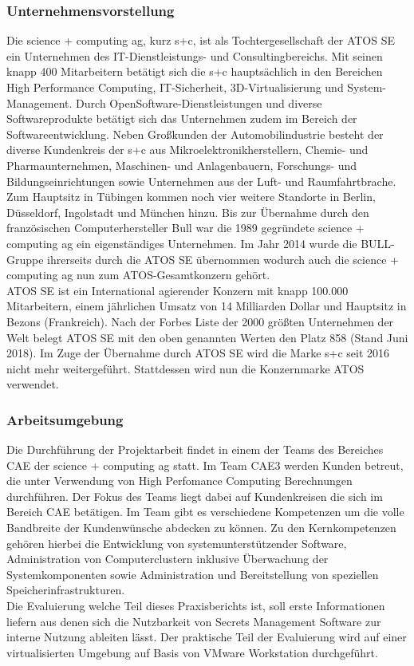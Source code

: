 \documentclass[
book,
a4paper,   
titlepage,  
halfparskip,
12pt        
]{scrartcl}
\begin{document}
\begin{onehalfspacing}
\subsubsection{Unternehmensvorstellung}
Die science + computing ag, kurz s+c, ist als Tochtergesellschaft der ATOS SE ein Unternehmen des \ac{IT}-Dienstleistungs- und Consultingbereichs. Mit seinen knapp 400 Mitarbeitern betätigt sich die s+c hauptsächlich in den Bereichen High Performance Computing, \ac{IT}-Sicherheit, 3D-Virtualisierung und System-Management. Durch OpenSoftware-Dienstleistungen und diverse Softwareprodukte betätigt sich das Unternehmen zudem im Bereich der Softwareentwicklung. Neben Großkunden der Automobilindustrie besteht der diverse Kundenkreis der s+c aus Mikroelektronikherstellern, Chemie- und Pharmaunternehmen, Maschinen- und Anlagenbauern, Forschungs- und Bildungseinrichtungen sowie Unternehmen aus der Luft- und Raumfahrtbrache.\\
Zum Hauptsitz in Tübingen kommen noch vier weitere Standorte in Berlin, Düsseldorf, Ingolstadt und München hinzu. Bis zur Übernahme durch den französischen Computerhersteller Bull war die 1989 gegründete science + computing ag ein eigenständiges Unternehmen.\cite{bull} Im Jahr 2014 wurde die BULL-Gruppe ihrerseits durch die ATOS SE übernommen wodurch auch die science + computing ag nun zum ATOS-Gesamtkonzern gehört.\cite{atos}\\
ATOS SE ist ein International agierender Konzern mit knapp 100.000 Mitarbeitern, einem jährlichen Umsatz von 14 Milliarden Dollar und Hauptsitz in Bezons (Frankreich). Nach der Forbes Liste der 2000 größten Unternehmen der Welt belegt ATOS SE mit den oben genannten Werten den Platz 858 (Stand Juni 2018).\cite{forbes} Im Zuge der Übernahme durch ATOS SE wird die Marke s+c seit 2016 nicht mehr weitergeführt. Stattdessen wird nun die Konzernmarke ATOS verwendet.

\subsubsection{Arbeitsumgebung}
Die Durchführung der Projektarbeit findet in einem der Teams des Bereiches \ac{CAE} der science + computing ag statt. Im Team \ac{CAE}3 werden Kunden betreut, die unter Verwendung von High Perfomance Computing Berechnungen durchführen. Der Fokus des Teams liegt dabei auf Kundenkreisen die sich im Bereich \ac{CAE} betätigen. Im Team gibt es verschiedene Kompetenzen um die volle Bandbreite der Kundenwünsche abdecken zu können. Zu den Kernkompetenzen gehören hierbei die Entwicklung von systemunterstützender Software, Administration von Computerclustern inklusive Überwachung der Systemkomponenten sowie Administration und Bereitstellung von speziellen Speicherinfrastrukturen.\\
Die Evaluierung welche Teil dieses Praxisberichts ist, soll erste Informationen liefern aus denen sich die Nutzbarkeit von Secrets Management Software zur interne Nutzung ableiten lässt. Der praktische Teil der Evaluierung wird auf einer virtualisierten Umgebung auf Basis von VMware Workstation durchgeführt.


\end{onehalfspacing}
\end{document}
